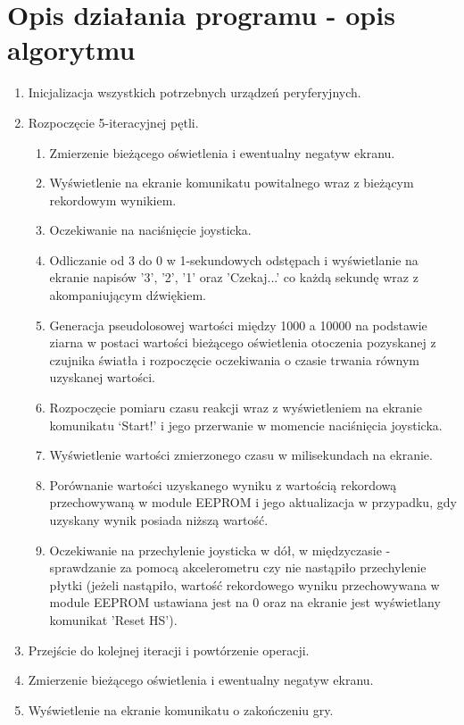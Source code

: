 \documentclass[a4paper,12pt]{report}
\begin{document}
\chapter{Opis działania programu - opis algorytmu}
\begin{enumerate}
    \item Inicjalizacja wszystkich potrzebnych urządzeń peryferyjnych.
    \item Rozpoczęcie 5-iteracyjnej pętli.
          \begin{enumerate}
              \item Zmierzenie bieżącego oświetlenia i ewentualny negatyw ekranu.
              \item Wyświetlenie na ekranie komunikatu powitalnego wraz z bieżącym rekordowym wynikiem.
              \item Oczekiwanie na naciśnięcie joysticka.
              \item Odliczanie od 3 do 0 w 1-sekundowych odstępach i wyświetlanie na ekranie napisów '3', '2', '1' oraz 'Czekaj...' co każdą sekundę wraz z akompaniującym dźwiękiem.
              \item Generacja pseudolosowej wartości między 1000 a 10000 na podstawie ziarna w postaci wartości bieżącego oświetlenia otoczenia pozyskanej z czujnika światła i rozpoczęcie oczekiwania o czasie trwania równym uzyskanej wartości.
              \item Rozpoczęcie pomiaru czasu reakcji wraz z wyświetleniem na ekranie komunikatu ‘Start!’ i jego przerwanie w momencie naciśnięcia joysticka.
              \item Wyświetlenie wartości zmierzonego czasu w milisekundach na ekranie.
              \item Porównanie wartości uzyskanego wyniku z wartością rekordową przechowywaną w module EEPROM i jego aktualizacja w przypadku, gdy uzyskany wynik posiada niższą wartość.
              \item Oczekiwanie na przechylenie joysticka w dół, w międzyczasie - sprawdzanie za pomocą akcelerometru czy nie nastąpiło przechylenie płytki (jeżeli nastąpiło, wartość rekordowego wyniku przechowywana w module EEPROM ustawiana jest na 0 oraz na ekranie jest wyświetlany komunikat 'Reset HS').
          \end{enumerate}
    \item Przejście do kolejnej iteracji i powtórzenie operacji.
    \item Zmierzenie bieżącego oświetlenia i ewentualny negatyw ekranu.
    \item Wyświetlenie na ekranie komunikatu o zakończeniu gry.
\end{enumerate}
\end{document}
